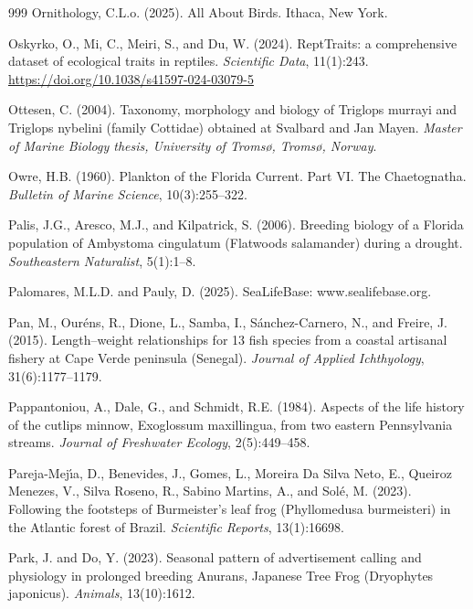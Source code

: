 \begin{thebibliography}{999}
Ornithology, C.L.o. (2025). All About Birds. Ithaca, New York.

Oskyrko, O., Mi, C., Meiri, S., and Du, W. (2024). ReptTraits: a comprehensive dataset of ecological traits in reptiles. \textit{Scientific Data}, 11(1):243. \url{https://doi.org/10.1038/s41597-024-03079-5}

Ottesen, C. (2004). Taxonomy, morphology and biology of Triglops murrayi and Triglops nybelini (family Cottidae) obtained at Svalbard and Jan Mayen. \textit{Master of Marine Biology thesis, University of Troms{\o}, Troms{\o}, Norway}.

Owre, H.B. (1960). Plankton of the Florida Current. Part VI. The Chaetognatha. \textit{Bulletin of Marine Science}, 10(3):255--322.

Palis, J.G., Aresco, M.J., and Kilpatrick, S. (2006). Breeding biology of a Florida population of Ambystoma cingulatum (Flatwoods salamander) during a drought. \textit{Southeastern Naturalist}, 5(1):1--8.

Palomares, M.L.D. and Pauly, D. (2025). {S}ea{L}ife{B}ase: www.sealifebase.org.

Pan, M., Our{\'e}ns, R., Dione, L., Samba, I., S{\'a}nchez-Carnero, N., and Freire, J. (2015). Length--weight relationships for 13 fish species from a coastal artisanal fishery at Cape Verde peninsula (Senegal). \textit{Journal of Applied Ichthyology}, 31(6):1177--1179.

Pappantoniou, A., Dale, G., and Schmidt, R.E. (1984). Aspects of the life history of the cutlips minnow, Exoglossum maxillingua, from two eastern Pennsylvania streams. \textit{Journal of Freshwater Ecology}, 2(5):449--458.

Pareja-Mej{\'\i}a, D., Benevides, J., Gomes, L., Moreira Da Silva Neto, E., Queiroz Menezes, V., Silva Roseno, R., Sabino Martins, A., and Sol{\'e}, M. (2023). Following the footsteps of Burmeister's leaf frog (Phyllomedusa burmeisteri) in the Atlantic forest of Brazil. \textit{Scientific Reports}, 13(1):16698.

Park, J. and Do, Y. (2023). Seasonal pattern of advertisement calling and physiology in prolonged breeding Anurans, Japanese Tree Frog (Dryophytes japonicus). \textit{Animals}, 13(10):1612.


\end{thebibliography}
